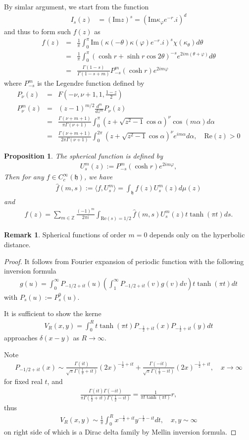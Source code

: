 \documentclass[11pt,reqno]{amsart}
\newcommand{\bna}{\begin{eqnarray*}}
\newcommand{\ena}{\end{eqnarray*}}
\newcommand{\mk}{\mathfrak}
\def\re{{\mathrm{Re}}}
\def\im{{\mathrm{Im}}}
\def\Z{\mathbb{Z}}
\newtheorem{prop}[lemma]{Proposition}
\theoremstyle{definition}
\newtheorem{remark}{Remark}
\begin{document}
By simlar argument, we start from the function
\bna
I_s(z)&=(\im z)^s=(\im \kappa_\varphi e^{-r}.i)^d
\ena
and thus to form such $f(z)$ as
\bna
f(z)&=&\frac{1}{\pi}\int_{0}^\pi \im (\kappa(-\theta)\kappa(\varphi) e^{-r}.i)^s \chi(\kappa_\theta)d\theta\\
&=&\frac{1}{\pi}\int_0^\pi(\cosh r+\sinh r\cos2\theta)^{-s}e^{2im(\theta+\varphi)}d\theta\\
&=&\frac{\Gamma(1-s)}{\Gamma(1-s+m)}P_{-s}^m(\cosh r)e^{2im\varphi}
\ena
where $P_{-s}^m$ is the Legendre function defined by
\bna
P_\nu(z)&=&F(-\nu,\nu+1,1,\frac{1-z}{2})\\
P_\nu^m(z)&=&(z-1)^{m/2}\frac{d^m}{dz^m}P_\nu(z)\\
&=&\frac{\Gamma(\nu+m+1)}{\pi\Gamma(\nu+1)}\int_0^\pi (z+\sqrt{z^2-1}\cos\alpha)^\nu\cos(m\alpha)d\alpha\\
&=&\frac{\Gamma(\nu+m+1)}{2\pi\Gamma(\nu+1)}\int_0^{2\pi} (z+\sqrt{z^2-1}\cos\alpha)^\nu e^{im\alpha}d\alpha,\quad \re(z)>0
\ena

\begin{prop}
The spherical function is defined by
\bna
U_s^m(z):=P_{-s}^m(\cosh r)e^{2im\varphi},
\ena
Then for any $f\in C_c^\infty(\mk h)$, we have
\bna
\widehat f(m,s):=\langle f, U_s^m\rangle=\int_{\mk h}f(z)U_s^m(z)d\mu(z)
\ena
and
\bna
f(z)=\sum_{m\in \Z}\frac{(-1)^m}{2\pi i}\int_{\re(s)=1/2}
\widehat f(m,s) U_s^{m}(z) t\tanh (\pi t)ds.
\ena
\end{prop}
\begin{remark}
Spherical functions of order $m=0$ depends only on the hyperbolic distance.
\end{remark}
\begin{proof}
It follows from Fourier expansion of periodic function with the following inversion formula
\bna
g(u)=\int_0^\infty P_{-1/2+it}(u)
\left(\int_{1}^\infty P_{-1/2+it}(v)g(v)dv\right) t\tanh(\pi t)dt
\ena
with $P_s(u):=P_s^0(u)$.


It is sufficient to show the kerne
\bna
V_R(x,y)=\int_{0}^Rt\tanh(\pi t)P_{-\frac{1}{2}+it}(x)P_{-\frac{1}{2}+it}(y)dt
\ena
approaches $\delta(x-y)$ as $R\rightarrow\infty$.

Note
\bna
P_{-1/2+it}(x)\sim\frac{\Gamma(it)}{\sqrt{\pi}\Gamma(\frac{1}{2}+it)}(2x)^{-\frac{1}{2}+it}
+
\frac{\Gamma(-it)}{\sqrt{\pi}\Gamma(\frac{1}{2}-it)}(2x)^{-\frac{1}{2}+it},\quad x\rightarrow\infty
\ena
for fixed real $t$,
 and
 \bna
 \frac{\Gamma(it)\Gamma(-it)}{\pi\Gamma(\frac{1}{2}+it)
 \Gamma(\frac{1}{2}-it)
 }=\frac{1}{\pi t \tanh(\pi t)}r,
\ena
thus
\bna
V_R(x,y)\sim\frac{1}{\pi}\int_0^R x^{-\frac{1}{2}+it}y^{-\frac{1}{2}-it}dt,\quad x,y\sim \infty
\ena
on right side of which  is a Dirac delta family by Mellin inversion formula.
\end{proof}
\end{document}
